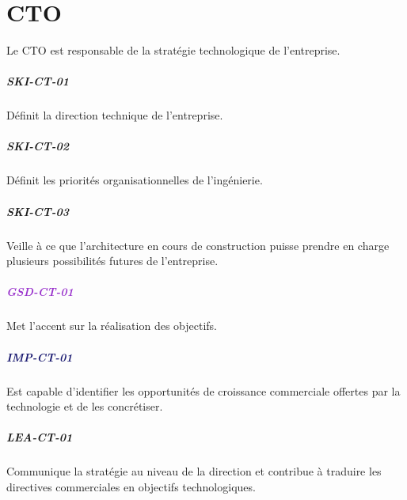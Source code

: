 \documentclass[a4paper, french, openany, 12pt]{book}
\newcommand\dex[1]{\textcolor{BrickRed}{\textbf{\uppercase{ski-{#1}}}}}
\newcommand\str[1]{\textcolor{DarkOrchid}{\textbf{\uppercase{gsd-{#1}}}}}
\newcommand\wis[1]{\textcolor{MidnightBlue}{\textbf{\uppercase{imp-{#1}}}}}
\newcommand\cha[1]{\textcolor{OliveGreen}{\textbf{\uppercase{lea-{#1}}}}}
\begin{document}
\chapter{CTO}

Le CTO est responsable de la stratégie technologique de l’entreprise.

\begin{multicols}{2}

  \paragraph*{\dex{ct-01}}

  Définit la direction technique de l'entreprise.

  \paragraph*{\dex{ct-02}}

  Définit les priorités organisationnelles de l'ingénierie.

  \paragraph*{\dex{ct-03}}

  Veille à ce que l'architecture en cours de construction puisse prendre en charge plusieurs possibilités futures de
  l'entreprise.

  \paragraph*{\str{ct-01}}

  Met l'accent sur la réalisation des objectifs.

  \paragraph*{\wis{ct-01}}

  Est capable d'identifier les opportunités de croissance commerciale offertes par la technologie et de les concrétiser.

  \paragraph*{\cha{ct-01}}

  Communique la stratégie au niveau de la direction et contribue à traduire les directives commerciales en objectifs
  technologiques.

\end{multicols}
\end{document}
